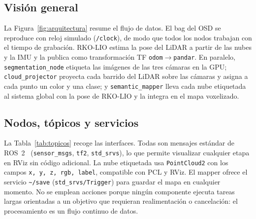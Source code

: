 \documentclass[11pt, twoside]{article}
\begin{document}
\subsection{Visión general}

La Figura~\ref{fig:arquitectura} resume el flujo de datos. El bag del OSD se reproduce con reloj simulado (\texttt{/clock}), de modo que todos los nodos trabajan con el tiempo de grabación. RKO-LIO estima la pose del LiDAR a partir de las nubes y la IMU y la publica como transformación TF \texttt{odom}$\rightarrow$\texttt{pandar}. En paralelo, \texttt{segmentation\_node} etiqueta las imágenes de las tres cámaras en la GPU; \texttt{cloud\_projector} proyecta cada barrido del LiDAR sobre las cámaras y asigna a cada punto un color y una clase; y \texttt{semantic\_mapper} lleva cada nube etiquetada al sistema global con la pose de RKO-LIO y la integra en el mapa voxelizado.

\subsection{Nodos, tópicos y servicios}

La Tabla~\ref{tab:topicos} recoge las interfaces. Todas son mensajes estándar de ROS~2~\cite{macenski2022ros2} (\texttt{sensor\_msgs}, \texttt{tf2}, \texttt{std\_srvs}), lo que permite visualizar cualquier etapa en RViz sin código adicional. La nube etiquetada usa \texttt{PointCloud2} con los campos \texttt{x, y, z, rgb, label}, compatible con PCL y RViz. El mapper ofrece el servicio \texttt{\textasciitilde/save} (\texttt{std\_srvs/Trigger}) para guardar el mapa en cualquier momento. No se emplean acciones porque ningún componente ejecuta tareas largas orientadas a un objetivo que requieran realimentación o cancelación: el procesamiento es un flujo continuo de datos.
\end{document}
